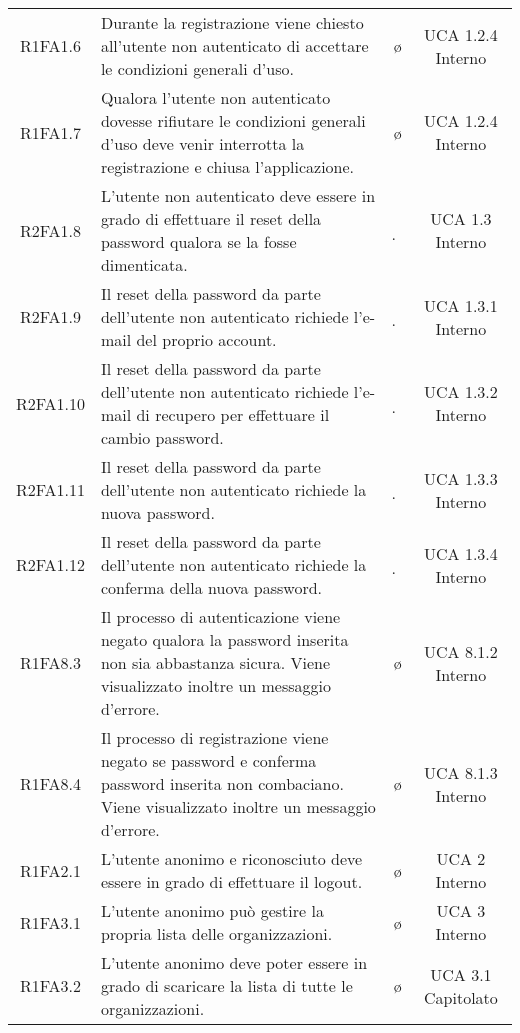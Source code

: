 {\begin{longtable}{ c C{6.5cm} c c}
R1FA1.6 & Durante la registrazione viene chiesto all'utente non autenticato di accettare le condizioni generali d'uso. & \o & UCA 1.2.4 Interno\\

R1FA1.7 & Qualora l'utente non autenticato dovesse rifiutare le condizioni generali d'uso deve venir interrotta la registrazione e chiusa l'applicazione. & \o & UCA 1.2.4 Interno\\

R2FA1.8 & L'utente non autenticato deve essere in grado di effettuare il reset della password qualora se la fosse dimenticata. & \d & UCA 1.3 Interno\\

R2FA1.9 & Il reset della password da parte dell'utente non autenticato richiede l'e-mail del proprio account. & \d & UCA 1.3.1 Interno\\

R2FA1.10 & Il reset della password da parte dell'utente non autenticato richiede l'e-mail di recupero per effettuare il cambio password. & \d & UCA 1.3.2 Interno\\

R2FA1.11 & Il reset della password da parte dell'utente non autenticato richiede la nuova password. & \d & UCA 1.3.3 Interno\\

R2FA1.12 & Il reset della password da parte dell'utente non autenticato richiede la conferma della nuova password. & \d & UCA 1.3.4 Interno\\

R1FA8.3 & Il processo di autenticazione viene negato qualora la password inserita non sia abbastanza sicura. Viene visualizzato inoltre un messaggio d'errore. & \o & UCA 8.1.2 Interno\\

R1FA8.4 & Il processo di registrazione viene negato se password e conferma password inserita non combaciano. Viene visualizzato inoltre un messaggio d'errore. & \o & UCA 8.1.3 Interno\\



R1FA2.1 & L'utente anonimo e riconosciuto deve essere in grado di effettuare il logout. & \o & UCA 2 Interno\\

R1FA3.1 & L'utente anonimo può gestire la propria lista delle organizzazioni. & \o & UCA 3 Interno\\

R1FA3.2 & L'utente anonimo deve poter essere in grado di scaricare la lista di tutte le organizzazioni. & \o & UCA 3.1 Capitolato \\


\end{longtable}}
